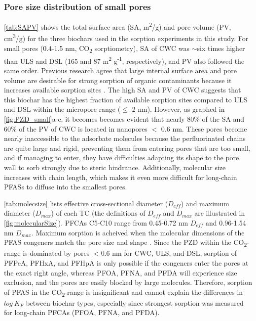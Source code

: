 \subsubsection{Pore size distribution of small pores}
\cref{tab:SAPV} shows the total surface area (SA, m\textsuperscript{2}/g) and pore volume (PV, cm\textsuperscript{3}/g) for the three biochars used in the sorption experiments in this study. For small pores (0.4-1.5 nm, CO\textsubscript{2} sorptiometry), SA of CWC was $\sim$six times higher than ULS and DSL (165 and 87  m\textsuperscript{2} g\textsuperscript{-1}, respectively), and PV also followed the same order. Previous research agree that large internal surface area and pore volume are desirable for strong sorption of organic contaminants because it increases available sorption sites \citep{ahmed2020per,Hale2016}. The high SA and PV of CWC suggests that this biochar has the highest fraction of available sorption sites compared to ULS and DSL within the micropore range ($\le$ 2 nm). However, as graphed in \cref{fig:PZD_small}a-c, it becomes becomes evident that nearly 80\% of the SA and 60\% of the PV of CWC is located in nanopores $<$ 0.6 nm. These pores become nearly inaccessible to the adsorbate molecules because the perfluorinated chains are quite large and rigid, preventing them from entering pores that are too small, and if managing to enter, they have difficulties adapting its shape to the pore wall to sorb strongly due to steric hindrance. Additionally, molecular size increases with chain length, which makes it even more difficult for long-chain PFASs to diffuse into the smallest pores. 

\cref{tab:molecsize} lists effective cross-sectional diameter ($D_{eff}$) and maximum diameter ($D_{max}$) of each TC (the definitions of $D_{eff}$ and $D_{max}$ are illustrated in \cref{fig:molecularSize}). PFCAs C5-C10 range from 0.45-0.72 nm $D_{eff}$ and 0.96-1.54 nm $D_{max}$. Maximum sorption is acheived when the molecular dimensions of the PFAS congeners match the pore size and shape \citep{Hale2016}. Since the PZD within the CO\textsubscript{2}-range is dominated by pores $<$0.6 nm for CWC, ULS, and DSL, sorption of PFPeA, PFHxA, and PFHpA is only possible if the congeners enter the pores at the exact right angle, whereas PFOA, PFNA, and PFDA will experience size exclusion, and the pores are easily blocked by large molecules. Therefore, sorption of PFAS in the CO\textsubscript{2}-range is insignificant and cannot explain the differences in $log~K_F$ between biochar types, especially since strongest sorption was measured for long-chain PFCAs (PFOA, PFNA, and PFDA).

